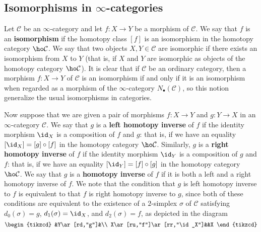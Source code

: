 \subsection{Isomorphisms in \texorpdfstring{$\infty$}{inf}-categories}
Let $\mathcal{C}$ be an $\infty$-category and let $f:X\to Y$ be a morphism of $\mathcal{C}$. We say that $f$ is an \textbf{isomorphism} if the homotopy class $[f]$ is an isomorphism in the homotopy category $\ho\mathcal{C}$. We say that two objects $X,Y\in\mathcal{C}$ are isomorphic if there exists an isomorphism from $X$ to $Y$ (that is, if $X$ and $Y$ are isomorphic as objects of the homotopy category $\ho\mathcal{C}$). It is clear that if $\mathcal{C}$ be an ordinary category, then a morphism $f:X\to Y$ of $\mathcal{C}$ is an isomorphism if and only if it is an isomorphism when regarded as a morphism of the $\infty$-category $N_\bullet(\mathcal{C})$, so this notion generalize the usual isomorphisms in categories.\par
Now suppose that we are given a pair of morphisms $f:X\to Y$ and $g:Y\to X$ in an $\infty$-category $\mathcal{C}$. We say that $g$ is a \textbf{left homotopy inverse} of $f$ if the identity morphism $\id_X$ is a composition of $f$ and $g$: that is, if we have an equality $[\id_X]=[g]\circ[f]$ in the homotopy category $\ho\mathcal{C}$. Similarly, $g$ is a \textbf{right homotopy inverse} of $f$ if the identity morphism $\id_Y$ is a composition of $g$ and $f$: that is, if we have an equality $[\id_Y]=[f]\circ[g]$ in the homotopy category $\ho\mathcal{C}$. We say that $g$ is a \textbf{homotopy inverse} of $f$ if it is both a left and a right homotopy inverse of $f$. We note that the condition that $g$ is left homotopy inverse to $f$ is equivalent to that $f$ is right homotopy inverse to $g$, since both of these conditions are equivalent to the existence of a $2$-simplex $\sigma$ of $\mathcal{C}$ satisfying $d_0(\sigma)=g$, $d_1(\sigma)=\id_X$, and $d_2(\sigma)=f$, as depicted in the diagram
\[\begin{tikzcd}
&Y\ar[rd,"g"]&\\
X\ar[ru,"f"]\ar[rr,"\id_X"]&&X
\end{tikzcd}\]

